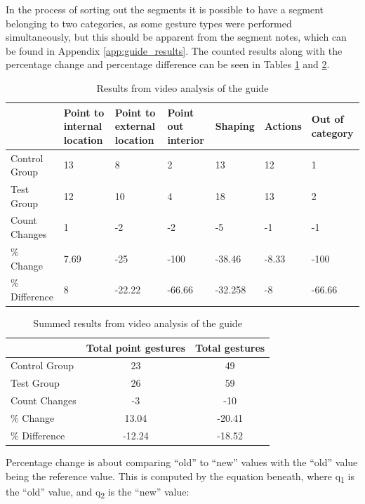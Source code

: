 In the process of sorting out the segments it is possible to have a segment belonging to two categories, as some gesture types were performed simultaneously, but this should be apparent from the segment notes, which can be found in Appendix \ref{app:guide_results}. The counted results along with the percentage change and percentage difference can be seen in Tables \ref{table:guide1} and \ref{table:guide2}. 

\begin{table}[h!]\centering
\begin{tabular}{| l | p{1.5cm} | p{1.4cm} | p{1.4cm} | l | l | p{1.5cm} |}\hline
 & Point to internal location & Point to external location & Point out interior & Shaping & Actions & Out of category \\ \hline
Control Group & 13 & 8 & 2 & 13 & 12 & 1 \\ \hline
Test Group & 12 & 10 & 4 & 18 & 13 & 2 \\ \hline \hline
Count Changes & 1 & -2 & -2 & -5 & -1 & -1 \\ \hline
\% Change & 7.69 & -25 & -100 & -38.46 & -8.33 & -100 \\ \hline
\% Difference & 8 & -22.22 & -66.66 & -32.258 & -8 & -66.66 \\ \hline
\end{tabular}
\caption{Results from video analysis of the guide \label{table:guide1}}
\end{table}

\begin{table}[h!]\centering
\begin{tabular}{| l | c | c |}\hline
 & Total point gestures & Total gestures \\ \hline
Control Group & 23 & 49 \\ \hline
Test Group & 26 & 59 \\ \hline \hline
Count Changes & -3 & -10 \\ \hline
\% Change & 13.04 & -20.41 \\ \hline
\% Difference & -12.24 & -18.52 \\ \hline
\end{tabular}
\caption{Summed results from video analysis of the guide \label{table:guide2}}
\end{table}

Percentage change is about comparing “old” to “new” values with the “old” value being the reference value. This is computed by the equation beneath, where q\textsubscript{1} is the “old” value, and q\textsubscript{2} is the “new” value:

